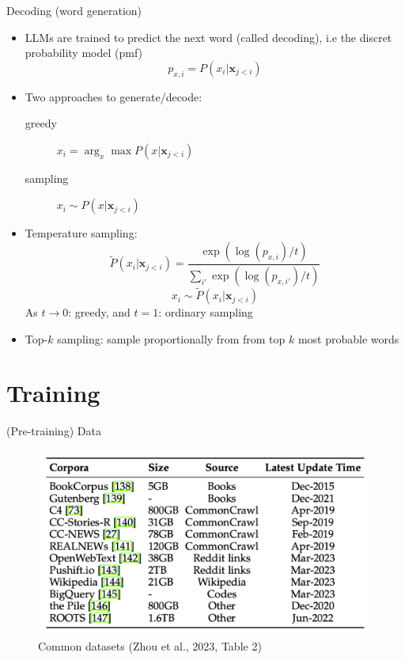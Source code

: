 \documentclass[10pt]{beamer}
\begin{document}
\begin{frame}{Decoding (word generation)}

\begin{itemize}
\item LLMs are trained to predict the next word (called decoding), i.e the discret probability model (pmf)
\[
p_{x,i} = P(x_i|\mathbf{x}_{j<i})
\]
\item Two approaches to generate/decode:
\begin{description}
\item[greedy] $x_i = \arg_x \max P(x|\mathbf{x}_{j<i})$
\item[sampling] $x_i \sim P(x|\mathbf{x}_{j<i})$
\end{description}
\item Temperature sampling:
\[
\tilde{P}(x_i|\mathbf{x}_{j<i}) = \frac{\exp(\log(p_{x,i})/t)}{\sum_{i'} \exp(\log(p_{x,i'})/t)}
\]
\[
x_i \sim \tilde{P}(x_i|\mathbf{x}_{j<i})
\]
As $t\rightarrow 0$: greedy, and $t = 1$: ordinary sampling
\item Top-$k$ sampling: sample proportionally from from top $k$ most probable words
\end{itemize}

\end{frame}



\section{Training}

\begin{frame}{(Pre-training) Data}

\begin{figure}[h]
\centering
\includegraphics[width=0.99\textwidth]{fig/zhou_2023_tab2}
\caption{Common datasets (Zhou et al., 2023, Table 2)}
\end{figure}


\end{frame}
\end{document}
